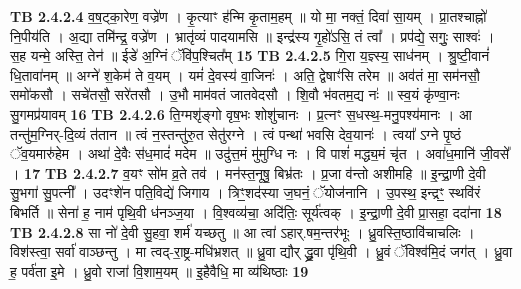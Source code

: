 \documentclass[17pt]{extarticle}
\begin{document}
                  \newline
                                \textbf{ TB 2.4.2.4} \newline
                  व॒ष॒ट्का॒रेण॒ वज्रे॑ण । कृ॒त्याꣳ ह॑न्मि कृ॒ताम॒हम् ॥ यो मा॒ नक्तं॒ दिवा॑ सा॒यम् । प्रा॒तश्चाह्नो॑ नि॒पीय॑ति । अ॒द्या तमि॑न्द्र॒ वज्रे॑ण । भ्रातृ॑व्यं पादयामसि ॥ इन्द्र॑स्य गृ॒हो॑ऽसि॒ तं त्वा᳚ । प्रप॑द्ये॒ सगुः॒ साश्वः॑ । स॒ह यन्मे॒ अस्ति॒ तेन॑ ॥ ईडे॑ अ॒ग्निं ॅवि॑प॒श्चित᳚म् \textbf{ 15} \newline
                  \newline
                                \textbf{ TB 2.4.2.5} \newline
                  गि॒रा य॒ज्ञ्स्य॒ साध॑नम् । श्रु॒ष्टी॒वानं॑ धि॒तावा॑नम् ॥ अग्ने॑ श॒केम॑ ते व॒यम् । यमं॑ दे॒वस्य॑ वा॒जिनः॑ । अति॒ द्वेषाꣳ॑सि तरेम ॥ अव॑तं मा॒ सम॑नसौ॒ समो॑कसौ । सचे॑तसौ॒ सरे॑तसौ । उ॒भौ माम॑वतं जातवेदसौ । शि॒वौ भ॑वतम॒द्य नः॑ ॥ स्व॒यं कृ॑ण्वा॒नः सु॒गमप्र॑यावम् \textbf{ 16} \newline
                  \newline
                                \textbf{ TB 2.4.2.6} \newline
                  ति॒ग्मशृ॑ङ्गो वृष॒भः शोशु॑चानः । प्र॒त्नꣳ स॒धस्थ॒-मनु॒पश्य॑मानः । आ तन्तु॑म॒ग्निर्-दि॒व्यं त॑तान ॥ त्वं न॒स्तन्तु॑रु॒त सेतु॑रग्ने । त्वं पन्था॑ भवसि देव॒यानः॑ । त्वया᳚ ऽग्ने पृ॒ष्ठं ॅव॒यमारु॑हेम । अथा॑ दे॒वैः स॑ध॒मादं॑ मदेम ॥ उदु॑त्त॒मं मु॑मुग्धि नः । वि पाशं॑ मद्ध्य॒मं चृ॑त । अवा॑ध॒मानि॑ जी॒वसे᳚ । \textbf{ 17} \newline
                  \newline
                                \textbf{ TB 2.4.2.7} \newline
                  व॒यꣳ सो॑म व्र॒ते तव॑ । मन॑स्त॒नूषु॒ बिभ्र॑तः । प्र॒जा व॑न्तो अशीमहि ॥ इ॒न्द्रा॒णी दे॒वी सु॒भगा॑ सु॒पत्नी᳚ । उदꣳशे॑न पति॒विद्ये॑ जिगाय । त्रिꣳ॒॒शद॑स्या ज॒घनं॒ ॅयोज॑नानि । उ॒पस्थ॒ इन्द्रꣳ॒॒ स्थवि॑रं बिभर्ति ॥ सेना॑ ह॒ नाम॑ पृथि॒वी ध॑नञ्ज॒या । वि॒श्वव्य॑चा॒ अदि॑तिः॒ सूर्य॑त्वक् । इ॒न्द्रा॒णी दे॒वी प्रा॒सहा॒ ददा॑ना \textbf{ 18} \newline
                  \newline
                                \textbf{ TB 2.4.2.8} \newline
                  सा नो॑ दे॒वी सु॒हवा॒ शर्म॑ यच्छतु ॥ आ त्वा॑ ऽहार्.षम॒न्तर॑भूः । ध्रु॒वस्ति॒ष्ठावि॑चाचलिः । विश॑स्त्वा॒ सर्वा॑ वाञ्छन्तु । मा त्वद्-रा॒ष्ट्र-मधि॑भ्रशत् ॥ ध्रु॒वा द्यौर् द्ध्रु॒वा पृ॑थि॒वी । ध्रु॒वं ॅविश्व॑मि॒दं जग॑त् । ध्रु॒वा ह॒ पर्व॑ता इ॒मे । ध्रु॒वो राजा॑ वि॒शाम॒यम् ॥ इ॒हैवैधि॒ मा व्य॑थिष्ठाः \textbf{ 19} \newline
\end{document}
